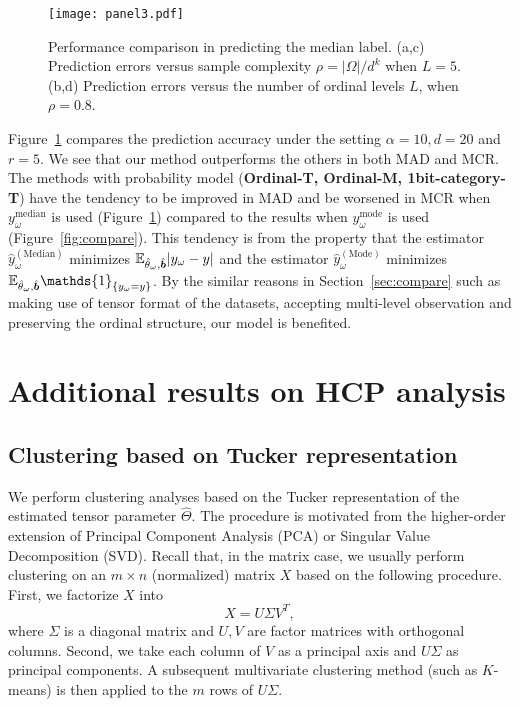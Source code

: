 \documentclass[11pt]{article}
\theoremstyle{plain}
\theoremstyle{definition}
\begin{document}
\begin{figure}[H]
  \begin{center}
    \texttt{[image: panel3.pdf]}
  \end{center}
  \caption{Performance comparison in predicting the median label. (a,c) Prediction errors versus sample complexity $\rho=|\Omega|/d^k$ when $L=5$. (b,d) Prediction errors versus the number of ordinal levels $L$, when $\rho=0.8.$}
  \label{fig:compare2}
\end{figure}

Figure~\ref{fig:compare2} compares the prediction accuracy under the setting $\alpha = 10, d = 20$ and $r = 5$. We see that our method outperforms the others in both MAD and MCR.  The methods with probability model ({\bf Ordinal-T, Ordinal-M, 1bit-category-T}) have the tendency to be improved in MAD and be worsened in MCR when  $y_\omega^{\text{median}}$ is used (Figure~\ref{fig:compare2}) compared to the results when $y_\omega^{\text{mode}}$ is used (Figure~\ref{fig:compare}). This tendency is from the property that the estimator $\hat y^{(\text{Median})}_\omega$ minimizes $\mathbb{E}_{\hat{\theta}_\omega,\hat{\bm{b}}}|y_\omega-y|$
and the estimator $\hat y^{(\text{Mode})}_\omega $ minimizes $\mathbb{E}_{\hat{\theta}_\omega,\hat{\mb}}\mathds{1}_{\{y_\omega=y\}}$. By the similar reasons in Section~\ref{sec:compare} such as making use of tensor format of the datasets, accepting multi-level observation and preserving the ordinal structure, our model is benefited.





\section{Additional results on HCP analysis}
\subsection{Clustering based on Tucker representation}\label{sec:clustering}
We perform clustering analyses based on the Tucker representation of the estimated tensor parameter $\hat\Theta$. The procedure is motivated from the higher-order extension of Principal Component Analysis (PCA) or Singular Value Decomposition (SVD). Recall that, in the matrix case, we usually perform clustering on an $m\times n$ (normalized) matrix $X$ based on the following procedure. First, we factorize $X$ into
\begin{equation}
X = U\Sigma V^T,
\end{equation}
where $\Sigma$ is a diagonal matrix and $ U,V$ are factor matrices with orthogonal columns. Second, we take each column of $V$ as a principal axis and $U\Sigma$ as principal components. A subsequent multivariate clustering method (such as $K$-means) is then applied to the $m$ rows of $U\Sigma$.
\end{document}
